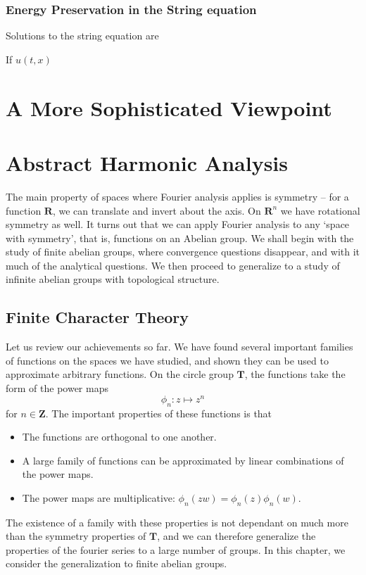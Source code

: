 \section{Energy Preservation in the String equation}

Solutions to the string equation are

If $u(t,x)$

\part{A More Sophisticated Viewpoint}

\part{Abstract Harmonic Analysis}

The main property of spaces where Fourier analysis applies is symmetry -- for a function $\mathbf{R}$, we can translate and invert about the axis. On $\mathbf{R}^n$ we have rotational symmetry as well. It turns out that we can apply Fourier analysis to any `space with symmetry', that is, functions on an Abelian group. We shall begin with the study of finite abelian groups, where convergence questions disappear, and with it much of the analytical questions. We then proceed to generalize to a study of infinite abelian groups with topological structure.


\chapter{Finite Character Theory}

Let us review our achievements so far. We have found several important families of functions on the spaces we have studied, and shown they can be used to approximate arbitrary functions. On the circle group $\mathbf{T}$, the functions take the form of the power maps
%
\[ \phi_n: z \mapsto z^n \]
%
for $n \in \mathbf{Z}$. The important properties of these functions is that
%
\begin{itemize}
    \item The functions are orthogonal to one another.
    \item A large family of functions can be approximated by linear combinations of the power maps.
    \item The power maps are multiplicative: $\phi_n(zw) = \phi_n(z) \phi_n(w)$.
\end{itemize}
%
The existence of a family with these properties is not dependant on much more than the symmetry properties of $\mathbf{T}$, and we can therefore generalize the properties of the fourier series to a large number of groups. In this chapter, we consider the generalization to finite abelian groups.

